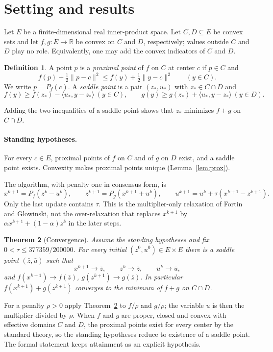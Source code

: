 \documentclass[11pt]{article}
\numberwithin{equation}{section}
\newtheorem{theorem}{Theorem}[section]
\theoremstyle{definition}
\newtheorem{definition}[theorem]{Definition}
\theoremstyle{remark}
\newcommand{\R}{\mathbb R}
\newcommand{\ip}[2]{\langle #1,#2\rangle}
\newcommand{\norm}[1]{\lVert #1\rVert}
\newcommand{\taunew}{377359/200000}
\begin{document}
\section{Setting and results}\label{sec:results}
Let $E$ be a finite-dimensional real inner-product space. Let $C,D\subseteq E$ be convex sets and let $f,g:E\to\R$ be convex on $C$ and $D$, respectively; values outside $C$ and $D$ play no role. Equivalently, one may add the convex indicators of $C$ and $D$.

\begin{definition}
A point $p$ is a \emph{proximal point} of $f$ on $C$ at center $c$ if $p\in C$ and
\[
f(p)+\tfrac12\norm{p-c}^2\le f(y)+\tfrac12\norm{y-c}^2\qquad(y\in C).
\]
We write $p=P_f(c)$. A \emph{saddle point} is a pair $(z_*,u_*)$ with $z_*\in C\cap D$ and
\[
f(y)\ge f(z_*)-\ip{u_*}{y-z_*}\ (y\in C),\qquad g(y)\ge g(z_*)+\ip{u_*}{y-z_*}\ (y\in D).
\]
\end{definition}
Adding the two inequalities of a saddle point shows that $z_*$ minimizes $f+g$ on $C\cap D$.

\paragraph{Standing hypotheses.}
For every $c\in E$, proximal points of $f$ on $C$ and of $g$ on $D$ exist, and a saddle point exists. Convexity makes proximal points unique (Lemma~\ref{lem:prox}).

The algorithm, with penalty one in consensus form, is
\begin{equation}\label{eq:admm}
x^{k+1}=P_f(z^k-u^k),\qquad z^{k+1}=P_g(x^{k+1}+u^k),\qquad u^{k+1}=u^k+\tau(x^{k+1}-z^{k+1}).
\end{equation}
Only the last update contains $\tau$. This is the multiplier-only relaxation of Fortin and Glowinski, not the over-relaxation that replaces $x^{k+1}$ by $\alpha x^{k+1}+(1-\alpha)z^k$ in the later steps.

\begin{theorem}[Convergence]\label{thm:main}
Assume the standing hypotheses and fix $0<\tau\le\taunew$. For every initial $(z^0,u^0)\in E\times E$ there is a saddle point $(\bar z,\bar u)$ such that
\[
x^{k+1}\to\bar z,\qquad z^k\to\bar z,\qquad u^k\to\bar u,
\]
and $f(x^{k+1})\to f(\bar z)$, $g(z^{k+1})\to g(\bar z)$. In particular $f(x^{k+1})+g(z^{k+1})$ converges to the minimum of $f+g$ on $C\cap D$.
\end{theorem}

For a penalty $\rho>0$ apply Theorem~\ref{thm:main} to $f/\rho$ and $g/\rho$; the variable $u$ is then the multiplier divided by $\rho$. When $f$ and $g$ are proper, closed and convex with effective domains $C$ and $D$, the proximal points exist for every center by the standard theory, so the standing hypotheses reduce to existence of a saddle point. The formal statement keeps attainment as an explicit hypothesis.
\end{document}
